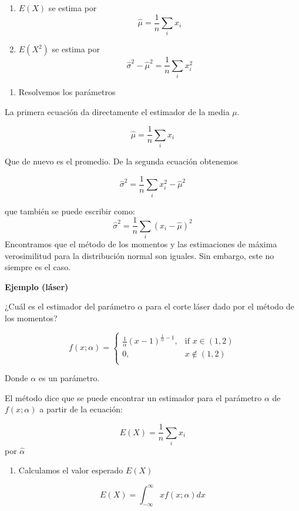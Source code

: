 \documentclass[
]{book}
\providecommand{\tightlist}{%
  \setlength{\itemsep}{0pt}\setlength{\parskip}{0pt}}
\begin{document}
\begin{enumerate}
\def\labelenumi{\alph{enumi}.}
\tightlist
\item
  \(E(X)\) se estima por \[\hat{\mu}=\frac{1}{n}\sum_i x_i\]
\item
  \(E(X^2)\) se estima por \[\hat{\sigma}^2-\hat{\mu}^2=\frac{1}{n}\sum_i x^2_i\]
\end{enumerate}

\begin{enumerate}
\def\labelenumi{\arabic{enumi}.}
\setcounter{enumi}{2}
\tightlist
\item
  Resolvemos los parámetros
\end{enumerate}

La primera ecuación da directamente el estimador de la media \(\mu\).

\[\hat{\mu}=\frac{1}{n}\sum_i x_i\]

Que de nuevo es el promedio. De la segunda ecuación obtenemos

\[\hat{\sigma}^2= \frac{1}{n} \sum_i x^2_i-\hat{\mu}^2\]

que también se puede escribir como:
\[\hat{\sigma}^2=\frac{1}{n} \sum_i(x_i-\hat{\mu})^2\]
Encontramos que el método de los momentos y las estimaciones de máxima verosimilitud para la distribución normal son iguales. Sin embargo, este no siempre es el caso.

\textbf{Ejemplo (láser)}

¿Cuál es el estimador del parámetro \(\alpha\) para el corte láser dado por el método de los momentos?

\[
    f(x; \alpha)= 
\begin{cases}
\frac{1}{\alpha}(x-1)^{\frac{1}{\alpha}-1},& \text{if } x \in (1,2)\\
    0,& x \notin (1,2)\\
\end{cases}
\]

Donde \(\alpha\) es un parámetro.

El método dice que se puede encontrar un estimador para el parámetro \(\alpha\) de \(f(x;\alpha)\) a partir de la ecuación:

\[E(X)=\frac{1}{n}\sum_i x_i\]
por \(\hat{\alpha}\)

\begin{enumerate}
\def\labelenumi{\arabic{enumi}.}
\tightlist
\item
  Calculamos el valor esperado \(E(X)\)
\end{enumerate}

\[E(X)=\int_{-\infty}^{\infty} xf(x;\alpha)dx\]
\end{document}
